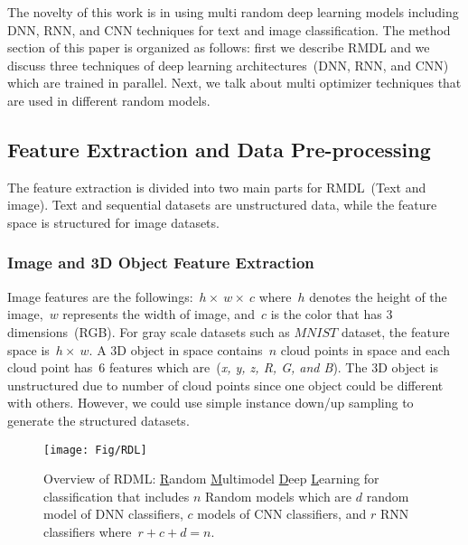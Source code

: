 \documentclass[sigconf, final]{acmart}
\begin{document}
The novelty of this work is in using multi random deep learning models including DNN, RNN, and CNN techniques for text and image classification. The method section of this paper is organized as follows: first we describe RMDL and we discuss three techniques of deep learning architectures~(DNN, RNN, and CNN) which are trained in parallel. Next, we talk about multi optimizer techniques that are used in different random models. 
\subsection{Feature Extraction and Data Pre-processing}\label{subsect:Feature}
The feature extraction is divided into two main parts for RMDL~(Text and image). Text and sequential datasets are unstructured data, while the feature space is structured for image datasets.
\subsubsection{Image and 3D Object Feature Extraction}
Image features are the followings:~$h\times~w\times~c$ where~$h$ denotes the height of the image,~$w$ represents the width of image, and~$c$ is the color that has 3 dimensions~(RGB). For gray scale datasets such as $MNIST$ dataset, the feature space is~$h\times~w$. A 3D object in space contains~$n$ cloud points in space and each cloud point has~$6$ features which are~(\textit{x, y, z, R, G, and B}). The 3D object is unstructured due to number of cloud points since one object could be different with others. However, we could use simple instance down/up sampling to generate the structured datasets.
\begin{figure*}[t]
\centering
\texttt{[image: Fig/RDL]}

\caption{Overview of RDML: \underline{R}andom \underline{M}ultimodel \underline{D}eep \underline{L}earning for classification that includes $n$ Random models which are $d$ random model of DNN classifiers, $c$ models of CNN classifiers, and $r$ RNN classifiers where~$r+c+d=n$.}\label{Fig_RMDL}
\vspace{-0.15in}

\end{figure*}
\end{document}

